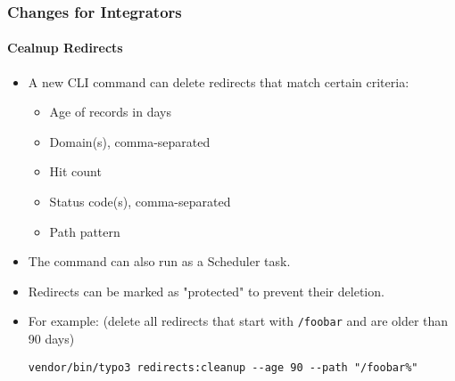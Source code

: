 %

\begin{frame}[fragile]
	\frametitle{Changes for Integrators}
	\framesubtitle{Cealnup Redirects}


	\begin{itemize}
		\item A new CLI command can delete redirects that match certain criteria:
			\begin{itemize}
				\item Age of records in days
				\item Domain(s), comma-separated
				\item Hit count
				\item Status code(s), comma-separated
				\item Path pattern
			\end{itemize}
		\item The command can also run as a Scheduler task.
		\item Redirects can be marked as "protected" to prevent their deletion.
		\item For example:\newline
			\smaller(delete all redirects that start with \texttt{/foobar} and are older than 90 days)\normalsize
\begin{lstlisting}
vendor/bin/typo3 redirects:cleanup --age 90 --path "/foobar%"
\end{lstlisting}

	\end{itemize}
\end{frame}


